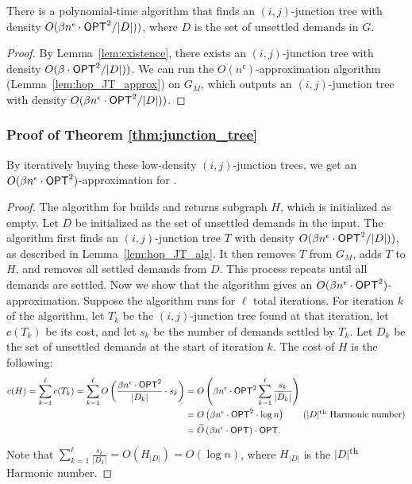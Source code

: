 \begin{lemma}
\label{lem:hop_JT_alg}
    There is a polynomial-time algorithm that finds an $(i,j)$-junction tree with density $O(\beta n^\epsilon \cdot {{{\sf OPT}}}^2 / |D|) )$, where $D$ is the set of unsettled demands in $G$.
\end{lemma}
\begin{proof}
    By Lemma~\ref{lem:existence}, there exists an $(i,j)$-junction tree with density $O(\beta \cdot {{{\sf OPT}}}^2 / |D|) )$. We can run the $O(n^\epsilon)$-approximation algorithm (Lemma~\ref{lem:hop_JT_approx}) on $G_M$, which outputs an $(i,j)$-junction tree with density $O(\beta n^\epsilon \cdot {{{\sf OPT}}}^2 / |D|) )$.
\end{proof}

\subsubsection{Proof of Theorem \ref{thm:junction_tree}}

By iteratively buying these low-density $(i,j)$-junction trees, we get an  $O(\beta n^\epsilon \cdot {{{\sf OPT}}}^2 )$-approximation for {\hopset}.

\begin{proof}
    The algorithm for {\hopset} builds and returns subgraph $H$, which is initialized as empty. Let $D$ be initialized as the set of unsettled demands in the input.
    The algorithm first finds an $(i,j)$-junction tree $T$ with density $O(\beta n^\epsilon \cdot {{{\sf OPT}}}^2 / |D|) )$, as described in Lemma~\ref{lem:hop_JT_alg}. It then removes $T$ from $G_M$, adds $T$ to $H$, and removes all settled demands from $D$. This process repeats until all demands are settled. 
     Now we show that the algorithm gives an $O(\beta n^\epsilon \cdot {{{\sf OPT}}}^2 )$-approximation. Suppose the algorithm runs for $\ell$ total iterations. For iteration $k$ of the algorithm, let $T_k$ be the $(i,j)$-junction tree found at that iteration, let $c(T_k)$ be its cost, and let $s_k$ be the number of demands settled by $T_k$. Let $D_k$ be the set of unsettled demands at the start of iteration $k$. The cost of $H$ is the following:
     \begin{align*}
         c(H) = \sum_{k=1}^{\ell} c(T_k) 
         = \sum_{k=1}^{\ell} O\left(   \frac{\beta n^\epsilon \cdot {{\opt}}^2 }{|D_k|}    \cdot s_k \right)  
         &= O \left( \beta n^\epsilon \cdot {{\opt}}^2     \sum_{k=1}^{\ell} \frac{s_k}{|D_k|} \right)  \\
         &= O \left( \beta n^\epsilon \cdot {{\opt}}^2   \cdot \log n \right) \tag{$|D|$\textsuperscript{th} Harmonic number} \\
         &= \widetilde{O}  \left( \beta n^\epsilon \cdot {{\opt}} \right) \cdot {\opt}.
     \end{align*}
    Note that $\sum_{k=1}^{\ell} \frac{s_k}{|D_k|} = O(H_{|D|}) = O(\log n)$, where $H_{|D|}$ is the $|D|$\textsuperscript{th} Harmonic number.
\end{proof}




